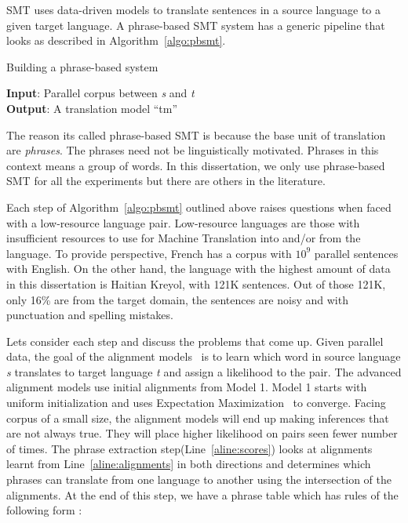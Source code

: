 SMT uses data-driven models to translate sentences in a source language to a given target language. A phrase-based SMT system has a generic pipeline that looks as described in Algorithm~\ref{algo:pbsmt}. 

\begin{algorithm}
\small
\caption{Building a phrase-based system}
\label{algo:pbsmt}
\textbf{Input}: Parallel corpus between \emph{s} and \emph{t} \\
\textbf{Output}: A translation model ``tm'' 
\begin{algorithmic}[l]
	 \label{aline:alignments}
	 \label{aline:scores}
	 \label{aline:MERT}
\end{algorithmic}
\end{algorithm}

The reason its called phrase-based SMT is because the base unit of translation are \emph{phrases}. The phrases need not be linguistically motivated. Phrases in this context means a group of words. In this dissertation, we only use phrase-based SMT for all the experiments but there are others in the literature. 

Each step of Algorithm~\ref{algo:pbsmt} outlined above raises questions when faced with a low-resource language pair. Low-resource languages are those with insufficient resources to use for Machine Translation into and/or from the language. To provide perspective, French has a corpus with $10^9$ parallel sentences with English. On the other hand, the language with the highest amount of data in this dissertation is Haitian Kreyol, with 121K sentences. Out of those 121K, only 16\% are from the target domain, the sentences are noisy and with punctuation and spelling mistakes.


Lets consider each step and discuss the problems that come up. Given parallel data, the goal of the alignment models~\cite{Brown:1993,Vogel:1996} is to learn which word in source language \emph{s} translates to target language \emph{t} and assign a likelihood to the pair. The advanced alignment models use initial alignments from Model 1. Model 1 starts with uniform initialization and uses Expectation Maximization~\cite{Dempster:77} to converge. Facing corpus of a small size, the alignment models will end up making inferences that are not always true. They will place higher likelihood on pairs seen fewer number of times. The phrase extraction step(Line~\ref{aline:scores}) looks at alignments learnt from Line~\ref{aline:alignments} in both directions and determines which phrases can translate from one language to another using the intersection of the alignments. At the end of this step, we have a phrase table which has rules of the following form : 


